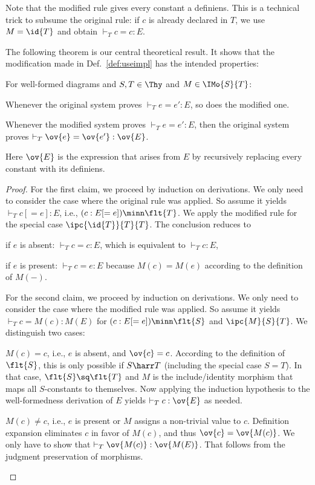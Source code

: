 Note that the modified rule gives every constant a definiens.
This is a technical trick to subsume the original rule: if $c$ is already declared in $T$, we use $M=\id{T}$ and obtain $\vdash_T c=c:E$.

The following theorem is our central theoretical result.
It shows that the modification made in Def.~\ref{def:useimpl} has the intended properties:
\begin{theorem}
For well-formed diagrams and $S,T\in\Thy$ and $M\in\IMo{S}{T}$:
\begin{compactenum}
 \item Whenever the original system proves $\vdash_T e=e':E$, so does the modified one.
 \item Whenever the modified system proves $\vdash_T e=e':E$, then the original system proves $\vdash_T \ov{e}=\ov{e'}:\ov{E}$.
\end{compactenum}
Here $\ov{E}$ is the expression that arises from $E$ by recursively replacing every constant with its definiens.
\end{theorem}

\begin{proof}
For the first claim, we proceed by induction on derivations.
We only need to consider the case where the original rule was applied.
So assume it yields $\vdash_T c[=e]:E$, i.e., $(c:E[=e]) \minn \flt{T}$.
We apply the modified rule for the special case $\ipc{\id{T}}{T}{T}$.
The conclusion reduces to
\begin{compactitem}
 \item if $e$ is absent: $\vdash_T c=c:E$, which is equivalent to $\vdash_T c:E$,
 \item if $e$ is present: $\vdash_T c=e:E$ because $M(c)=M(e)$ according to the definition of $M(-)$.
\end{compactitem}

For the second claim, we proceed by induction on derivations.
We only need to consider the case where the modified rule was applied.
So assume it yields $\vdash_T c=M(c):M(E)$ for $(c:E[=e]) \minn \flt{S}$ and $\ipc{M}{S}{T}$.
We distinguish two cases:
\begin{compactitem}
 \item $M(c)=c$, i.e., $e$ is absent, and $\ov{c}=c$.
   According to the definition of $\flt{S}$, this is only possible if $S\harr T$ (including the special case $S=T$).
   In that case, $\flt{S}\sq\flt{T}$ and $M$ is the include/identity morphism that maps all $S$-constants to themselves.
   Now applying the induction hypothesis to the well-formedness derivation of $E$ yields $\vdash_T c:\ov{E}$ as needed.
 \item $M(c)\neq c$, i.e., $e$ is present or $M$ assigns a non-trivial value to $c$.
  Definition expansion eliminates $c$ in favor of $M(c)$, and thus $\ov{c}=\ov{M(c)}$.
  We only have to show that $\vdash_T \ov{M(c)}:\ov{M(E)}$. That follows from the judgment preservation of morphisms.
\end{compactitem}
\end{proof}


